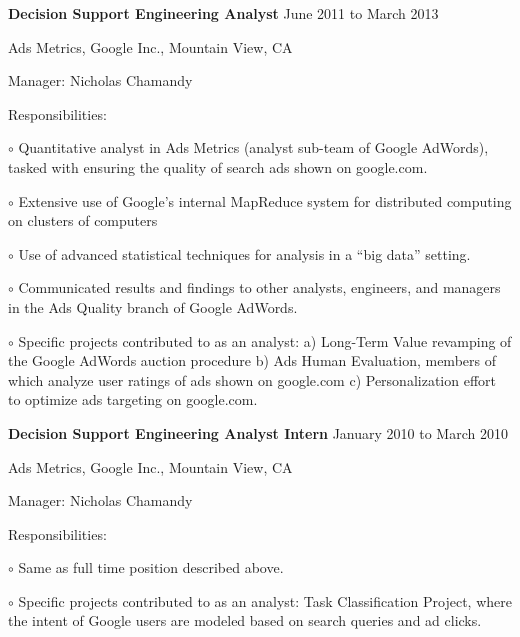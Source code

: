 \documentclass[10pt]{article}
\newcommand{\halfblankline}{\quad\vspace{-0.5\baselineskip}\pagebreak[3]}
\begin{document}
\textbf{Decision Support Engineering Analyst} \hfill {June 2011 to March 2013}
\begin{outerlist}
    \item[] Ads Metrics, Google Inc., Mountain View, CA
    \begin{innerlist}
        \item Manager: Nicholas Chamandy
        \item Responsibilities:
            \begin{innerlist}
			\item[$\circ$] Quantitative analyst in Ads Metrics (analyst sub-team 
			of Google AdWords), tasked with ensuring the quality of search 
			ads shown on google.com.
			\item[$\circ$] Extensive use of Google's internal MapReduce system 
			for distributed computing on clusters of computers
			\item[$\circ$] Use of advanced statistical techniques for analysis 
			in a ``big data'' setting.
			\item[$\circ$] Communicated results and findings to other analysts, 
			engineers, and managers in the Ads Quality branch of Google AdWords.
			\item[$\circ$] Specific projects contributed to as an analyst: 
			a) Long-Term Value revamping of the Google AdWords auction 
			procedure b) Ads Human Evaluation, members of which analyze user 
			ratings of ads shown on google.com c) Personalization effort to 
			optimize ads targeting on google.com.
            \end{innerlist}
    \end{innerlist}
\end{outerlist}

\halfblankline

\textbf{Decision Support Engineering Analyst Intern} \hfill {January 2010 to March 2010}
\begin{outerlist}
    \item[] Ads Metrics, Google Inc., Mountain View, CA
    \begin{innerlist}
        \item Manager: Nicholas Chamandy
        \item Responsibilities:
            \begin{innerlist}
			\item[$\circ$] Same as full time position described above.
			\item[$\circ$] Specific projects contributed to as an analyst: Task 
			Classification Project, where the intent of Google users are modeled 
			based on search queries and ad clicks.
            \end{innerlist}
    \end{innerlist}
\end{outerlist}
\end{document}
